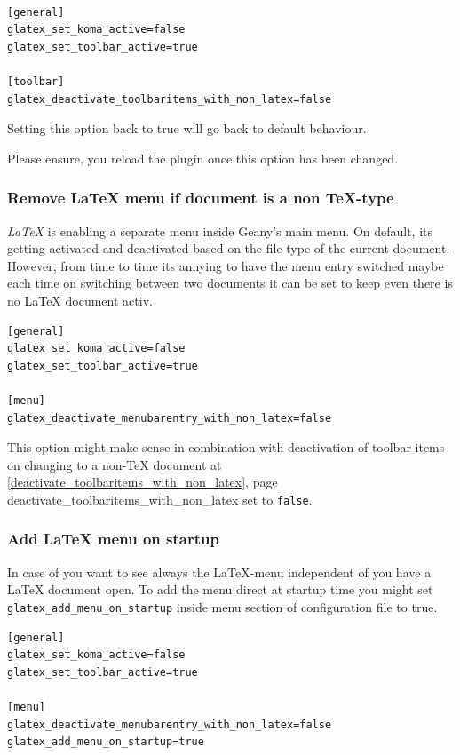 \documentclass[%
paper=a4,%
fontsize=11pt,%
twoside=false,%
DIV18,%
headsepline,%
plainheadsepline,%
footsepline,%
plainfootsepline,%
bibliography=totoc,%
listof=totoc,%
BCOR10mm,%
parskip=half,%
openany,%
]{scrreprt}
\begin{document}
\begin{lstlisting}[caption={Configuration to enable toolbar buttons if %
                            no \LaTeX{} is active}]

[general]
glatex_set_koma_active=false
glatex_set_toolbar_active=true

[toolbar]
glatex_deactivate_toolbaritems_with_non_latex=false
\end{lstlisting}

Setting this option back to true will go back to default behaviour.

Please ensure, you reload the plugin once this option has been changed.

\subsubsection{Remove \LaTeX{} menu if document is a non \TeX-type}
\label{deactivate_menubarentry_with_non_latex}
\textit{LaTeX} is enabling a separate menu inside Geany's main menu.
On default, its getting activated and deactivated based on the file
type of the current document. However, from time to time its annying
to have the menu entry switched maybe each time on switching between
two documents it can be set to keep even there is no LaTeX document
activ.

\begin{lstlisting}[caption={Configuration to keep \LaTeX{} menu inside menubar}]
[general]
glatex_set_koma_active=false
glatex_set_toolbar_active=true

[menu]
glatex_deactivate_menubarentry_with_non_latex=false
\end{lstlisting}

This option might make sense in combination with deactivation of
toolbar items on changing to a non-\TeX{} document at
\ref{deactivate_toolbaritems_with_non_latex}, page \pageref
{deactivate_toolbaritems_with_non_latex} set to \texttt{false}.

\subsubsection{Add \LaTeX{} menu on startup}

In case of you want to see always the \LaTeX{}-menu independent of
you have a \LaTeX{} document open. To add the menu direct at startup
time you might set \texttt{glatex\_add\_menu\_on\_startup} inside
menu section of configuration file to true.

\begin{lstlisting}[caption={Configuration add \LaTeX{} menu on startup of Geany}]
[general]
glatex_set_koma_active=false
glatex_set_toolbar_active=true

[menu]
glatex_deactivate_menubarentry_with_non_latex=false
glatex_add_menu_on_startup=true
\end{lstlisting}
\end{document}
